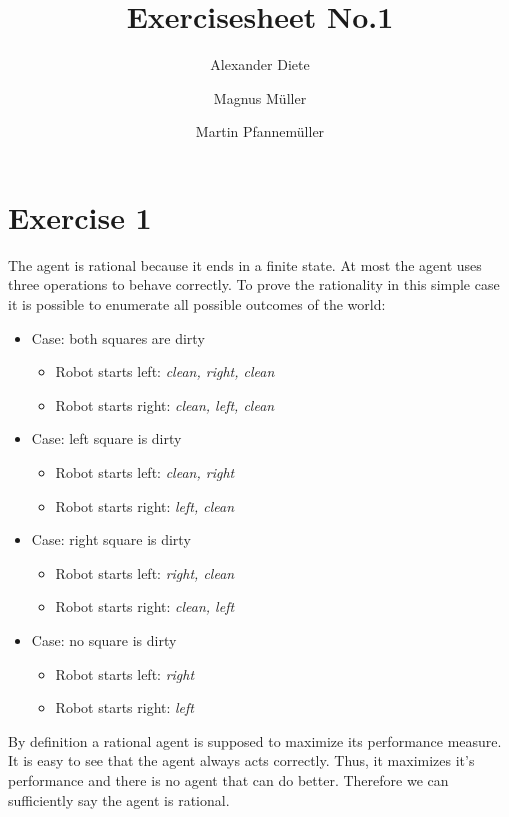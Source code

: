 \documentclass[11pt]{article}
\title{Exercisesheet No.1}
\author{Alexander Diete \and Magnus M\"uller \and Martin Pfannem\"uller}
\begin{document}
\maketitle
\section*{Exercise 1}
The agent is rational because it ends in a finite state. At most the agent uses three operations to behave correctly. To prove the rationality in this simple case it is possible to enumerate all possible outcomes of the world:

\begin{itemize}
  \item Case: both squares are dirty
  \begin{itemize}
    \item Robot starts left: \textit{clean, right, clean}
    \item Robot starts right: \textit{clean, left, clean} 
  \end{itemize}
  \item Case: left square is dirty
  \begin{itemize}
    \item Robot starts left: \textit{clean, right}
    \item Robot starts right: \textit{left, clean} 
  \end{itemize}
  \item Case: right square is dirty
  \begin{itemize}
    \item Robot starts left: \textit{right, clean}
    \item Robot starts right: \textit{clean, left} 
  \end{itemize}
  \item Case: no square is dirty
  \begin{itemize}
    \item Robot starts left: \textit{right}
    \item Robot starts right: \textit{left} 
  \end{itemize}
\end{itemize}

\noindent
By definition a rational agent is supposed to maximize its performance measure. It is easy to see that the agent always acts correctly. Thus, it maximizes it's performance and there is no agent that can do better. Therefore we can sufficiently say the agent is rational. 

\newpage
\end{document}
